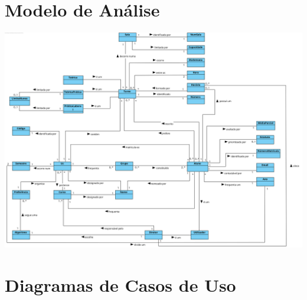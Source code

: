 \documentclass[a4paper,12pt]{scrreprt}
\begin{document}


\chapter{Modelo de Análise}
\vspace{2cm}

\begin{minipage}{\textwidth}
    \centering
    \includegraphics[width=1\textwidth]{images/modelo-analise.png}
    \label{fig:modelo_analise}
\end{minipage}



\chapter{Diagramas de Casos de Uso}
\vspace{1cm}
\end{document}
